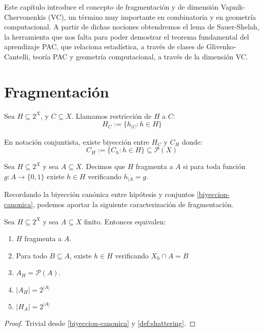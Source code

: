Este capítulo introduce el concepto de fragmentación y de dimensión Vapnik-Chervonenkis (VC), un término muy importante en 
combinatoria y en geometría computacional. A partir de dichas nociones obtendremos el lema de Sauer-Shelah, la herramienta 
que nos falta para poder demostrar el teorema fundamental del aprendizaje PAC, que relaciona estadística, a través de 
clases de Glivenko-Cantelli, teoría PAC y geometría computacional, a través de la dimensión VC.

\section{Fragmentación}
\begin{definition}
Sea $H\subseteq 2^X$, y $C \subseteq X$. Llamamos restricción de $H$ a $C$:
\[
  H_{C} := \{h_{|C} : h\in H\}
\]

En notación conjuntista, existe biyección entre $H_C$ y $C_{H}$ donde:
\[
  C_{H} := \{C_h : h\in H\} \subseteq \mathcal{P}(X)
\]
\end{definition}

\begin{definition}
 Sea $H\subseteq 2^X$ y sea $A\subseteq X$. Decimos que $H$ fragmenta a $A$ si para toda función $g:A\rightarrow \{0,1\}$ 
 existe $h\in H$ verificando $h_{|A} = g$.
 \label{def:shattering}
\end{definition}

Recordando la biyección canónica entre hipótesis y conjuntos \ref{biyeccion-canonica}, podemos aportar la siguiente 
caracterización de fragmentación.

\begin{fact}
 Sea $H\subseteq 2^X$ y sea $A\subseteq X$ finito. Entonces equivalen:
 \begin{enumerate}[i]
  \item $H$ fragmenta a $A$.
  \item Para todo $B\subseteq A$, existe $h\in H$ verificando $X_h \cap A = B$
  \item $A_H = \mathcal{P}(A)$.
  \item $|A_H| = 2^{|A|}$
  \item $|H_A| = 2^{|A|}$
 \end{enumerate}
\end{fact}

  \begin{proof}
   Trivial desde \ref{biyeccion-canonica} y \ref{def:shattering}.
  \end{proof}

